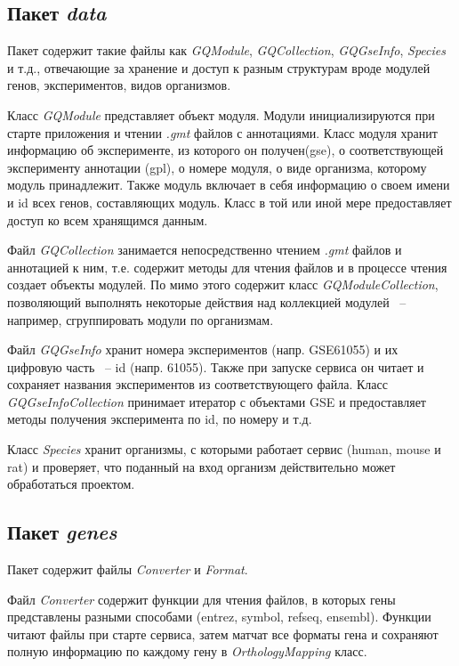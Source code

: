 \documentclass[times,specification,annotation]{itmo-student-thesis}
\begin{document}
\subsection{Пакет \textit{data}}
Пакет содержит такие файлы как \textit{GQModule}, \textit{GQCollection}, \textit{GQGseInfo}, \textit{Species} и т.д., отвечающие за хранение и доступ к разным структурам вроде модулей генов, экспериментов, видов организмов. 

Класс \textit{GQModule} представляет объект модуля. Модули инициализируются при старте приложения и чтении \textit{.gmt} файлов с аннотациями. Класс модуля хранит информацию об эксперименте, из которого он получен(gse), о соответствующей эксперименту аннотации (gpl), о номере модуля, о виде организма, которому модуль принадлежит. Также модуль включает в себя информацию о своем имени и id всех генов, составляющих модуль. Класс в той или иной мере предоставляет доступ ко всем хранящимся данным.

Файл \textit{GQCollection} занимается непосредственно чтением \textit{.gmt} файлов и аннотацией к ним, т.е. содержит методы для чтения файлов и в процессе чтения создает объекты модулей. По мимо этого содержит класс \textit{GQModuleCollection}, позволяющий выполнять некоторые действия над коллекцией модулей ~-- например, сгруппировать модули по организмам.

Файл \textit{GQGseInfo} хранит номера экспериментов (напр. GSE61055) и их цифровую часть ~-- id (напр. 61055). Также при запуске сервиса он читает и сохраняет названия экспериментов из соответствующего файла. Класс \textit{GQGseInfoCollection} принимает итератор с объектами GSE и предоставляет методы получения эксперимента по id, по номеру и т.д.

Класс \textit{Species} хранит организмы, с которыми работает сервис (human, mouse и rat) и проверяет, что поданный на вход организм действительно может обработаться проектом. 


\subsection{Пакет \textit{genes}}
Пакет содержит файлы \textit{Converter} и \textit{Format}.

Файл \textit{Converter} содержит функции для чтения файлов, в которых гены представлены разными способами (entrez, symbol, refseq, ensembl). Функции читают файлы при старте сервиса, затем матчат все форматы гена и сохраняют полную информацию по каждому гену в \textit{OrthologyMapping} класс.
\end{document}
